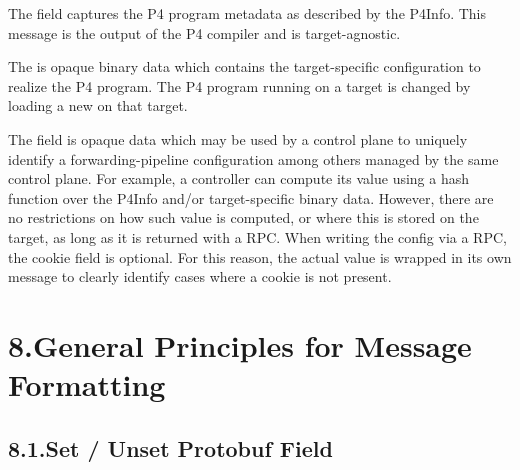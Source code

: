 \documentclass[11pt]{article}
\begin{document}
{%
\noindent{}The  field captures the P4 program metadata as described by the P4Info.
This message is the output of the P4 compiler and is target-agnostic.%

The  is opaque binary data which contains the target-specific
configuration to realize the P4 program. The P4 program running on a target is
changed by loading a new  on that target.%

The  field is opaque data which may be used by a control plane to
uniquely identify a forwarding-pipeline configuration among others managed by
the same control plane. For example, a controller can compute its value using a
hash function over the P4Info and/or target-specific binary data. However, there
are no restrictions on how such value is computed, or where this is stored on
the target, as long as it is returned with a  RPC.
When writing the config via a  RPC, the cookie
field is optional. For this reason, the actual value is wrapped in its own
message to clearly identify cases where a cookie is not present.%

\section{8.\hspace*{0.5em}General Principles for Message Formatting}\label{sec-general-principles-for-message-formatting}%

\subsection{8.1.\hspace*{0.5em}Set / Unset Protobuf Field}\label{sec-set-unset-protobuf-field}%

}
\end{document}
